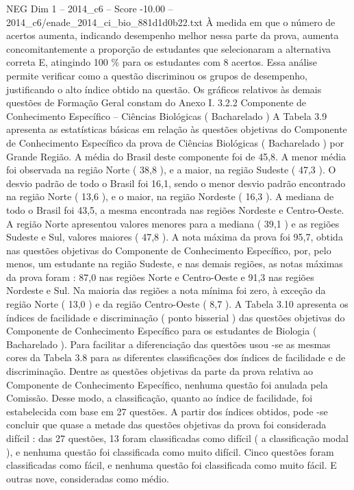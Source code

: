 \begin{textsample}{NEG Dim 1 – 2014\_c6 – Score -10.00 – 2014\_c6/enade\_2014\_ci\_bio\_881d1d0b22.txt}
À medida em que o número de acertos aumenta, indicando desempenho melhor nessa parte da prova, aumenta concomitantemente a proporção de estudantes que selecionaram a alternativa correta E, atingindo 100 \% para os estudantes com 8 acertos.
Essa análise permite verificar como a questão discriminou os grupos de desempenho, justificando o alto índice obtido na questão.
Os gráficos relativos às demais questões de Formação Geral constam do Anexo I. 3.2.2 Componente de Conhecimento Específico – Ciências Biológicas ( Bacharelado ) A Tabela 3.9 apresenta as estatísticas básicas em relação às questões objetivas do Componente de Conhecimento Específico da prova de Ciências Biológicas ( Bacharelado ) por Grande Região.
A média do Brasil deste componente foi de 45,8.
A menor média foi observada na região Norte ( 38,8 ), e a maior, na região Sudeste ( 47,3 ).
O desvio padrão de todo o Brasil foi 16,1, sendo o menor desvio padrão encontrado na região Norte ( 13,6 ), e o maior, na região Nordeste ( 16,3 ).
A mediana de todo o Brasil foi 43,5, a mesma encontrada nas regiões Nordeste e Centro-Oeste.
A região Norte apresentou valores menores para a mediana ( 39,1 ) e as regiões Sudeste e Sul, valores maiores ( 47,8 ).
A nota máxima da prova foi 95,7, obtida nas questões objetivas do Componente de Conhecimento Específico, por, pelo menos, um estudante na região Sudeste, e nas demais regiões, as notas máximas da prova foram : 87,0 nas regiões Norte e Centro-Oeste e 91,3 nas regiões Nordeste e Sul.
Na maioria das regiões a nota mínima foi zero, à exceção da região Norte ( 13,0 ) e da região Centro-Oeste ( 8,7 ).
A Tabela 3.10 apresenta os índices de facilidade e discriminação ( ponto bisserial ) das questões objetivas do Componente de Conhecimento Específico para os estudantes de Biologia ( Bacharelado ).
Para facilitar a diferenciação das questões usou -se as mesmas cores da Tabela 3.8 para as diferentes classificações dos índices de facilidade e de discriminação.
Dentre as questões objetivas da parte da prova relativa ao Componente de Conhecimento Específico, nenhuma questão foi anulada pela Comissão.
Desse modo, a classificação, quanto ao índice de facilidade, foi estabelecida com base em 27 questões.
A partir dos índices obtidos, pode -se concluir que quase a metade das questões objetivas da prova foi considerada difícil : das 27 questões, 13 foram classificadas como difícil ( a classificação modal ), e nenhuma questão foi classificada como muito difícil.
Cinco questões foram classificadas como fácil, e nenhuma questão foi classificada como muito fácil.
E outras nove, consideradas como médio.

\end{textsample}
